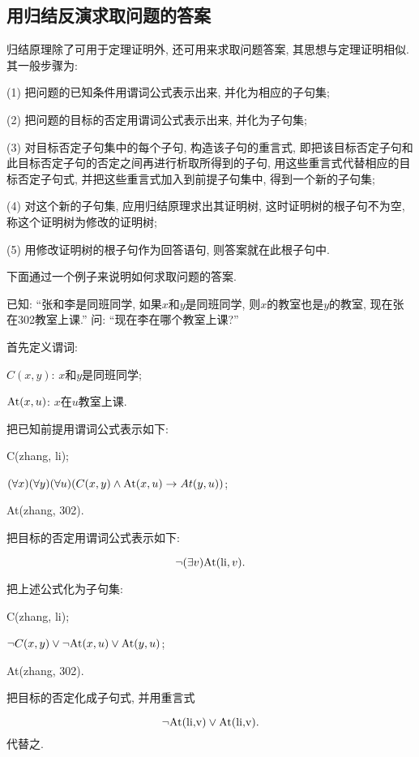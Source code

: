 \subsection{用归结反演求取问题的答案}

归结原理除了可用于定理证明外, 还可用来求取问题答案, 其思想与定理证明相似. 其一般步骤为:

(1) 把问题的已知条件用谓词公式表示出来, 并化为相应的子句集;

(2) 把问题的目标的否定用谓词公式表示出来, 并化为子句集;

(3) 对目标否定子句集中的每个子句, 构造该子句的重言式, 即把该目标否定子句和此目标否定子句的否定之间再进行析取所得到的子句, 用这些重言式代替相应的目标否定子句式, 并把这些重言式加入到前提子句集中, 得到一个新的子句集;

(4) 对这个新的子句集, 应用归结原理求出其证明树, 这时证明树的根子句不为空, 称这个证明树为修改的证明树;

(5) 用修改证明树的根子句作为回答语句, 则答案就在此根子句中.

下面通过一个例子来说明如何求取问题的答案.
\begin{example}
已知: “张和李是同班同学, 如果$x$和$y$是同班同学, 则$x$的教室也是$y$的教室, 现在张在302教室上课.”
问: “现在李在哪个教室上课?”
\end{example}
\begin{result}
首先定义谓词:

$C(x, y)$:     $x$和$y$是同班同学;

$\textup{At}(x, u)$:    $x$在$u$教室上课.

把已知前提用谓词公式表示如下:

C(zhang, li);

$(\forall x) (\forall y) (\forall u) (C(x, y)\wedge \textup{At}(x, u)\rightarrow At(y,u))$;

\textup{At}(zhang, 302).

把目标的否定用谓词公式表示如下:

$$\neg (\exists  v)\textup{At}(\textup{li}, v).$$

把上述公式化为子句集:

\textup{C(zhang, li)};

$\neg C(x, y)\vee \neg \textup{At}(x, u)\vee \textup{At}(y, u)$;

\textup{At}(zhang, 302).

把目标的否定化成子句式, 并用重言式

    $$\neg \textup{At(li,v)} \vee \textup{At(li,v)}.$$
代替之.
\end{result}


